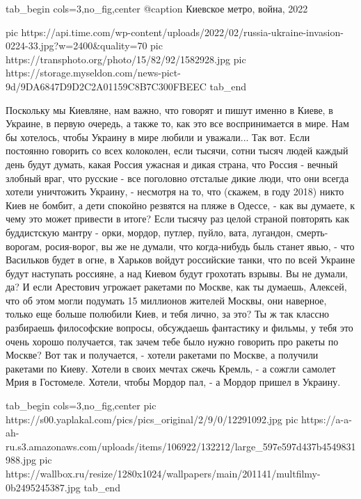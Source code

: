 \ifcmt
  tab_begin cols=3,no_fig,center
		 @caption Киевское метро, война, 2022

		 pic https://api.time.com/wp-content/uploads/2022/02/russia-ukraine-invasion-0224-33.jpg?w=2400&quality=70
		 pic https://transphoto.org/photo/15/82/92/1582928.jpg
		 pic https://storage.myseldon.com/news-pict-9d/9DA6847D9D2C2A01159C8B7C300FBEEC
  tab_end
\fi

Поскольку мы Киевляне, нам важно, что
говорят и пишут именно в Киеве, в Украине, в первую очередь, а также то, как
это все воспринимается в мире. Нам бы хотелось, чтобы Украину в мире любили и
уважали... Так вот. Если постоянно говорить со всех колоколен, если тысячи,
сотни тысяч людей каждый день будут думать, какая Россия ужасная и дикая
страна, что Россия - вечный злобный враг, что русские - все поголовно отсталые
дикие люди, что они всегда хотели уничтожить Украину, - несмотря на то, что
(скажем, в году 2018) никто Киев не бомбит, а дети спокойно резвятся на пляже в
Одессе, - как вы думаете, к чему это может привести в итоге? Если тысячу раз
целой страной повторять как буддистскую мантру - орки, мордор, путлер, пуйло,
вата, лугандон, смерть-ворогам, росия-ворог, вы же не думали, что когда-нибудь
быль станет явью, - что Васильков будет в огне, в Харьков войдут российские
танки, что по всей Украине будут наступать россияне, а над Киевом будут
грохотать взрывы. Вы не думали, да? И если Арестович угрожает ракетами по
Москве, как ты думаешь, Алексей, что об этом могли подумать 15 миллионов
жителей Москвы, они наверное, только еще больше полюбили Киев, и тебя лично, за
это? Ты ж так классно разбираешь философские вопросы, обсуждаешь фантастику и
фильмы, у тебя это очень хорошо получается, так зачем тебе было нужно говорить
про ракеты по Москве? Вот так и получается, - хотели ракетами по Москве, а
получили ракетами по Киеву. Хотели в своих мечтах сжечь Кремль, - а сожгли
самолет Мрия в Гостомеле.  Хотели, чтобы Мордор пал, - а Мордор пришел в
Украину.

\ifcmt
  tab_begin cols=3,no_fig,center
     pic https://s00.yaplakal.com/pics/pics_original/2/9/0/12291092.jpg
     pic https://a-a-ah-ru.s3.amazonaws.com/uploads/items/106922/132212/large_597e597d437b4549831988.jpg
     pic https://wallbox.ru/resize/1280x1024/wallpapers/main/201141/multfilmy-0b2495245387.jpg
  tab_end
\fi

